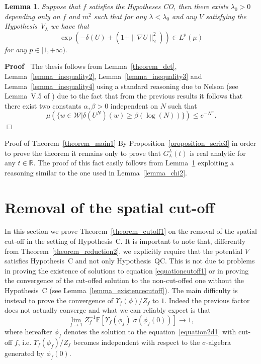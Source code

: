 \documentclass[a4paper,10pt]{article}
\newenvironment{proof}{\noindent\textbf{Proof\ }}{\hspace*{\fill}$\Box$\medskip}
\newenvironment{proof*}[1]{\noindent\textbf{#1\ }}{\hspace*{\fill}$\Box$\medskip}
\newtheorem{lemma}{Lemma}
\begin{document}
\begin{lemma}
  \label{lemma_Lp}Suppose that $f$ satisfies the Hypotheses CO, then there
  exists $\lambda_0 > 0$ depending only on $f$ and $m^2$ such that for any
  $\lambda < \lambda_0$ and any $V$ satisfying the Hypothesis~$V_{\lambda}$ we
  have that
  \[ \exp (- \delta (U) + (1 + \| \nabla U \|^2_2)) \in L^p (\mu) \]
  for any $p \in [1, + \infty) .$
\end{lemma}

\begin{proof}
  The thesis follows from Lemma~\ref{theorem_det},
  Lemma~\ref{lemma_inequality2}, Lemma~\ref{lemma_inequality3} and
  Lemma~\ref{lemma_inequality4} using a standard reasoning due to Nelson (see
  Lemma~V.5 of {\cite{Simon1974}}) due to the fact that from the previous
  results it follows that there exist two constants $\alpha, \beta > 0$
  independent on $N$ such that
  \[ \mu (\{ w \in \mathcal{W}| \delta (U^N) (w) \geqslant \beta (\log (N))
     \}) \leqslant e^{- N^{\alpha}} . \]
\end{proof}

\begin{proof*}{Proof of Theorem~\ref{theorem_main1}}
  By Proposition~\ref{proposition_serie3} in order to prove the theorem it
  remains only to prove that $G^L_{\lambda} (t)$ is real analytic for any $t
  \in \mathbb{R}$. The proof of this fact easily follows from
  Lemma~\ref{lemma_Lp} exploiting a reasoning similar to the one used in
  Lemma~\ref{lemma_chi2}.
\end{proof*}

\section{Removal of the spatial cut-off}

\label{sec:removal}In this section we prove Theorem~\ref{theorem_cutoff1} on
the removal of the spatial cut-off in the setting of Hypothesis~C. It is
important to note that, differently from Theorem~\ref{theorem_reduction2}, we
explicitly require that the potential $V$ satisfies Hypothesis~C and not only
Hypothesis~QC. This is not due to problems in proving the existence of
solutions to equation {\eqref{equationcutoff1}} or in proving the convergence
of the cut-offed solution to the non-cut-offed one without the Hypothesis~C
(see Lemma~\ref{lemma_existencecutoff}). The main difficulty is instead to
prove the convergence of $\Upsilon_f (\phi) / Z_f$ to $1$. Indeed the previous
factor does not actually converge and what we can reliably expect is that
\begin{equation}
  \lim_{f \rightarrow 1} Z_f^{- 1} \mathbb{E} [\Upsilon_f (\phi_f) | \sigma
  (\phi_f (0))] \rightarrow 1, \label{eq:decorr}
\end{equation}
where hereafter $\phi_f$ denotes the solution to the
equation~{\eqref{equation2d1}} with cut-off $f$, i.e. $\Upsilon_f (\phi_f) /
Z_f$ becomes independent with respect to the $\sigma$-algebra generated by
$\phi_f (0)$.
\end{document}
